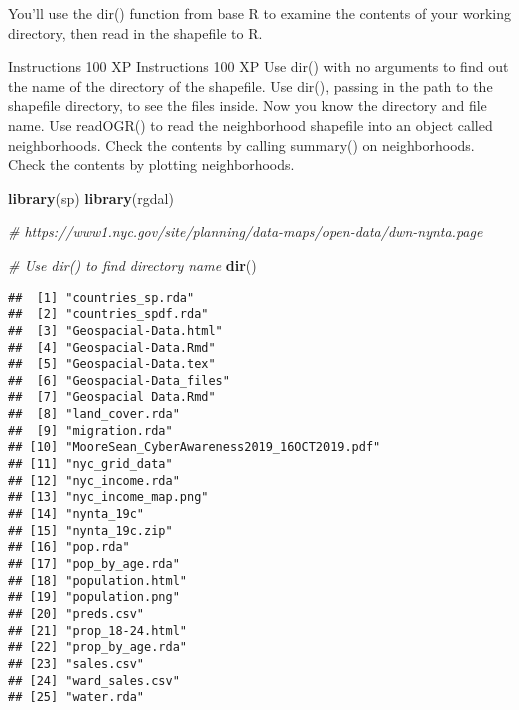 \documentclass[]{article}
\newenvironment{Shaded}{\begin{snugshade}}{\end{snugshade}}
\newcommand{\CommentTok}[1]{\textcolor[rgb]{0.56,0.35,0.01}{\textit{#1}}}
\newcommand{\KeywordTok}[1]{\textcolor[rgb]{0.13,0.29,0.53}{\textbf{#1}}}
\newcommand{\NormalTok}[1]{#1}
\begin{document}
You'll use the dir() function from base R to examine the contents of
your working directory, then read in the shapefile to R.

Instructions 100 XP Instructions 100 XP Use dir() with no arguments to
find out the name of the directory of the shapefile. Use dir(), passing
in the path to the shapefile directory, to see the files inside. Now you
know the directory and file name. Use readOGR() to read the neighborhood
shapefile into an object called neighborhoods. Check the contents by
calling summary() on neighborhoods. Check the contents by plotting
neighborhoods.

\begin{Shaded}
\begin{Highlighting}[]
\KeywordTok{library}\NormalTok{(sp)}
\KeywordTok{library}\NormalTok{(rgdal)}

\CommentTok{# https://www1.nyc.gov/site/planning/data-maps/open-data/dwn-nynta.page}

\CommentTok{# Use dir() to find directory name}
\KeywordTok{dir}\NormalTok{()}
\end{Highlighting}
\end{Shaded}

\begin{verbatim}
##  [1] "countries_sp.rda"                          
##  [2] "countries_spdf.rda"                        
##  [3] "Geospacial-Data.html"                      
##  [4] "Geospacial-Data.Rmd"                       
##  [5] "Geospacial-Data.tex"                       
##  [6] "Geospacial-Data_files"                     
##  [7] "Geospacial Data.Rmd"                       
##  [8] "land_cover.rda"                            
##  [9] "migration.rda"                             
## [10] "MooreSean_CyberAwareness2019_16OCT2019.pdf"
## [11] "nyc_grid_data"                             
## [12] "nyc_income.rda"                            
## [13] "nyc_income_map.png"                        
## [14] "nynta_19c"                                 
## [15] "nynta_19c.zip"                             
## [16] "pop.rda"                                   
## [17] "pop_by_age.rda"                            
## [18] "population.html"                           
## [19] "population.png"                            
## [20] "preds.csv"                                 
## [21] "prop_18-24.html"                           
## [22] "prop_by_age.rda"                           
## [23] "sales.csv"                                 
## [24] "ward_sales.csv"                            
## [25] "water.rda"
\end{verbatim}
\end{document}
